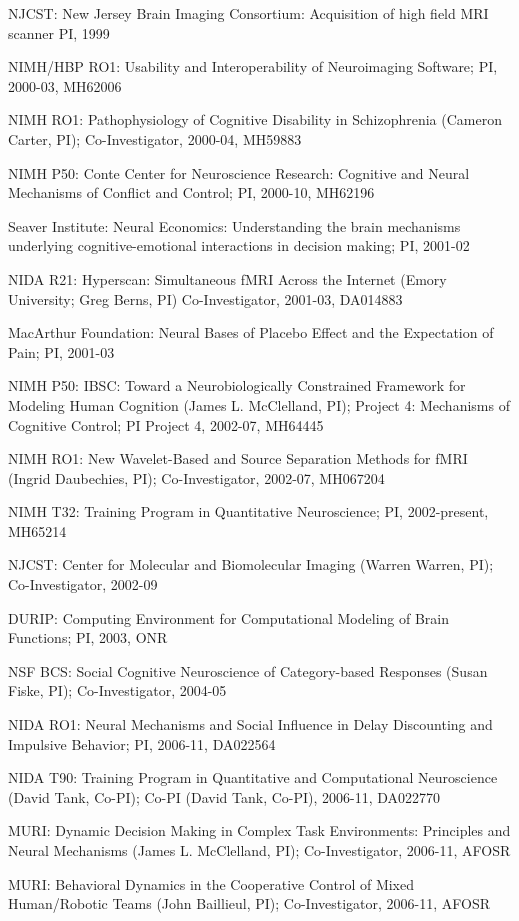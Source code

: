 \documentclass[10 pt]{article}
\begin{document}
NJCST:
New Jersey Brain Imaging Consortium: Acquisition of high field MRI scanner
PI,
1999

NIMH/HBP RO1:
Usability and Interoperability of Neuroimaging Software;
PI,
2000-03,
MH62006

NIMH RO1:
Pathophysiology of Cognitive Disability in Schizophrenia (Cameron Carter, PI);
Co-Investigator,
2000-04,
MH59883

NIMH P50:
Conte Center for Neuroscience Research: Cognitive and Neural Mechanisms of Conflict and Control;
PI,
2000-10,
MH62196

Seaver Institute:
Neural Economics: Understanding the brain mechanisms underlying cognitive-emotional interactions in decision making;
PI,
2001-02

NIDA R21:
Hyperscan: Simultaneous fMRI Across the Internet (Emory University; Greg Berns, PI)
Co-Investigator,
2001-03,
DA014883

MacArthur Foundation:
Neural Bases of Placebo Effect and the Expectation of Pain;
PI,
2001-03

NIMH P50:
IBSC: Toward a Neurobiologically Constrained Framework for Modeling Human Cognition (James L. McClelland, PI);
Project 4: Mechanisms of Cognitive Control;
PI Project 4,
2002-07,
MH64445

NIMH RO1:
New Wavelet-Based and Source Separation Methods for fMRI (Ingrid Daubechies, PI);
Co-Investigator,
2002-07,
MH067204

NIMH T32:
Training Program in Quantitative Neuroscience;
PI,
2002-present,
MH65214

NJCST:
Center for Molecular and Biomolecular Imaging (Warren Warren, PI);
Co-Investigator,
2002-09

DURIP:
Computing Environment for Computational Modeling of Brain Functions;
PI,
2003,
ONR

NSF BCS:
Social Cognitive Neuroscience of Category-based Responses (Susan Fiske, PI);
Co-Investigator,
2004-05

NIDA RO1:
Neural Mechanisms and Social Influence in Delay Discounting and Impulsive Behavior;
PI,
2006-11,
DA022564

NIDA T90:
Training Program in Quantitative and Computational Neuroscience (David Tank, Co-PI);
Co-PI (David Tank, Co-PI),
2006-11,
DA022770

MURI:
Dynamic Decision Making in Complex Task Environments: Principles and Neural Mechanisms (James L. McClelland, PI);
Co-Investigator,
2006-11,
AFOSR

MURI:
Behavioral Dynamics in the Cooperative Control of Mixed Human/Robotic Teams (John Baillieul, PI);
Co-Investigator,
2006-11,
AFOSR
\end{document}
